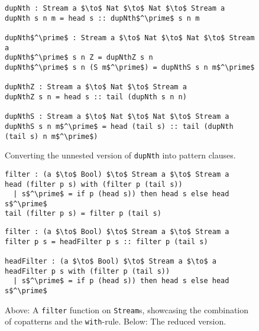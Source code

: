 \begin{figure}
\begin{lstlisting}[mathescape]
dupNth : Stream a $\to$ Nat $\to$ Nat $\to$ Stream a
dupNth s n m = head s :: dupNth$^\prime$ s n m

dupNth$^\prime$ : Stream a $\to$ Nat $\to$ Nat $\to$ Stream a
dupNth$^\prime$ s n Z = dupNthZ s n
dupNth$^\prime$ s n (S m$^\prime$) = dupNthS s n m$^\prime$

dupNthZ : Stream a $\to$ Nat $\to$ Stream a
dupNthZ s n = head s :: tail (dupNth s n n)

dupNthS : Stream a $\to$ Nat $\to$ Nat $\to$ Stream a
dupNthS s n m$^\prime$ = head (tail s) :: tail (dupNth (tail s) n m$^\prime$)
\end{lstlisting}
  
  \caption{Converting the unnested version of \texttt{dupNth} into pattern clauses.}
  \label{fig:dupNth_unnesting_pattern_clauses}
\end{figure}


\begin{figure}
\begin{lstlisting}[mathescape]
filter : (a $\to$ Bool) $\to$ Stream a $\to$ Stream a
head (filter p s) with (filter p (tail s))
  | s$^\prime$ = if p (head s)) then head s else head s$^\prime$
tail (filter p s) = filter p (tail s)
\end{lstlisting}

\begin{lstlisting}[mathescape]
filter : (a $\to$ Bool) $\to$ Stream a $\to$ Stream a
filter p s = headFilter p s :: filter p (tail s)

headFilter : (a $\to$ Bool) $\to$ Stream a $\to$ a
headFilter p s with (filter p (tail s))
  | s$^\prime$ = if p (head s)) then head s else head s$^\prime$
\end{lstlisting}
  \caption{Above: A \texttt{filter} function on \texttt{Stream}s, showcasing the
    combination of copatterns and the \texttt{with}-rule. Below: The reduced
    version.}
\label{fig:copatterns_with_rule}
\end{figure}
